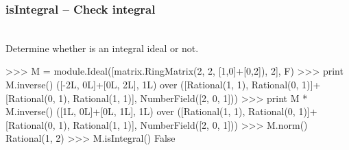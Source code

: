   \subsubsection{isIntegral -- Check integral}
   \\
   \spacing
   \quad Determine whether  is an integral ideal or not.\\
   \spacing
\begin{ex}
>>> M = module.Ideal([matrix.RingMatrix(2, 2, [1,0]+[0,2]), 2], F)
>>> print M.inverse()
([-2L, 0L]+[0L, 2L], 1L)
 over
([Rational(1, 1), Rational(0, 1)]+[Rational(0, 1), Rational(1, 1)],
 NumberField([2, 0, 1]))
>>> print M * M.inverse()
([1L, 0L]+[0L, 1L], 1L)
 over
([Rational(1, 1), Rational(0, 1)]+[Rational(0, 1), Rational(1, 1)],
 NumberField([2, 0, 1]))
>>> M.norm()
Rational(1, 2)
>>> M.isIntegral()
False
\end{ex}%
\C

